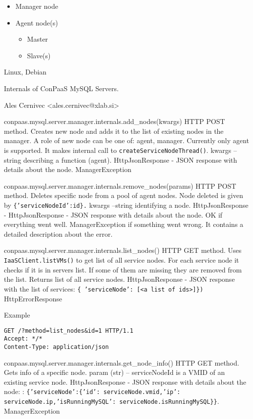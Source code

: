 \documentclass[a4paper,10pt]{article}
\begin{document}
\begin{itemize}
	\item Manager node
	\item Agent node(s)
	\begin{itemize}
		\item Master
		\item Slave(s)
	\end{itemize}	
\end{itemize}

Linux, Debian

Internals of ConPaaS MySQL Servers.

Ales Cernivec <ales.cernivec@xlab.si>
      
\vspace{10pt}

\noindent\conapi
{conpaas.mysql.server.manager.internals.add\_nodes(kwargs)}
{HTTP POST method. Creates new node and adds it to the list of existing nodes in the manager. A role of new node can be one of: agent, manager. Currently only agent is supported. It makes internal call to {\tt createServiceNodeThread()}.}
{kwargs -- string describing a function (agent).}
{HttpJsonResponse - JSON response with details about the node.}
{ManagerException}

\noindent\conapi
{ conpaas.mysql.server.manager.internals.remove\_nodes(params)}
{HTTP POST method. Deletes specific node from a pool of agent nodes. Node deleted is given by {\tt \{'serviceNodeId':id\}.}}
{kwargs --string identifying a node.}
{HttpJsonResponse - HttpJsonResponse - JSON response with details about the node. OK if everything went well. }
{ManagerException if something went wrong. It contains a detailed description about the error.}

\noindent\conapi
{ conpaas.mysql.server.manager.internals.list\_nodes()}
{ HTTP GET method. Uses {\tt IaaSClient.listVMs()} to get list of all service nodes. For each service node it checks if it is in servers list. If some of them are missing they are removed from the list. Returns list of all service nodes.}
{}
{HttpJsonResponse - JSON response with the list of services: {\tt \{ 'serviceNode': [<a list of ids>]\})}}
{HttpErrorResponse}

Example
\begin{verbatim}
GET /?method=list_nodes&id=1 HTTP/1.1
Accept: */*
Content-Type: application/json
\end{verbatim}

\noindent\conapi
{ conpaas.mysql.server.manager.internals.get\_node\_info()}
{HTTP GET method. Gets info of a specific node.}
{param (str) -- serviceNodeId is a VMID of an existing service node.}
{HttpJsonResponse - JSON response with details about the node: : {\tt \{'serviceNode':\{'id': serviceNode.vmid,'ip': serviceNode.ip,'isRunningMySQL': serviceNode.isRunningMySQL\}\}}.}
{ManagerException}
\end{document}
